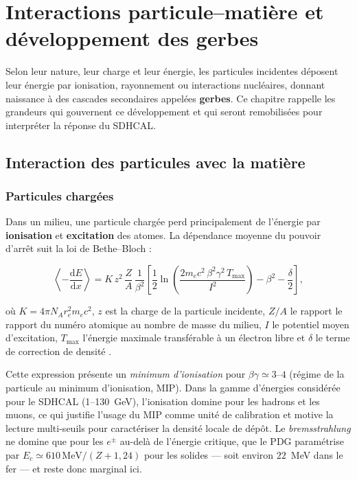 \chapter{Interactions particule--matière et développement des gerbes}
\label{sec:interactions}

Selon leur nature, leur charge et leur énergie, les particules incidentes déposent leur énergie par
ionisation, rayonnement ou interactions nucléaires, donnant naissance à des cascades secondaires
appelées \textbf{gerbes}. Ce chapitre rappelle les grandeurs qui gouvernent ce développement et qui
seront remobilisées pour interpréter la réponse du SDHCAL.

\section{Interaction des particules avec la matière}
\label{sec:interactions-matiere}

\subsection{Particules chargées}

Dans un milieu, une particule chargée perd principalement de l'énergie par \textbf{ionisation} et
\textbf{excitation} des atomes. La dépendance moyenne du pouvoir d'arrêt suit la loi de
Bethe--Bloch \cite{bichsel1988, pdg2024} :

\begin{equation}
\left\langle -\frac{\mathrm{d}E}{\mathrm{d}x} \right\rangle
= K\,z^{2}\,\frac{Z}{A}\,\frac{1}{\beta^{2}}
\left[
\frac{1}{2}\ln\!\left(
\frac{2 m_{e} c^{2}\,\beta^{2}\gamma^{2}\,T_{\max}}{I^{2}}
\right)
- \beta^{2} - \frac{\delta}{2}
\right],
\label{eq:bethe-bloch}
\end{equation}

où $K = 4\pi N_A r_e^2 m_e c^2$, $z$ est la charge de la particule incidente, $Z/A$ le rapport
le rapport du numéro atomique au nombre de masse du milieu, $I$ le potentiel moyen d'excitation, $T_{\max}$ l'énergie maximale
transférable à un électron libre et $\delta$ le terme de correction de densité \cite{pdg2024}.

Cette expression présente un \textit{minimum d'ionisation} pour $\beta\gamma \simeq 3$--$4$
(régime de la particule au minimum d'ionisation, MIP). Dans la gamme d'énergies considérée pour
le SDHCAL (1--130~GeV), l'ionisation domine pour les hadrons et les muons, ce qui justifie l'usage
du MIP comme unité de calibration et motive la lecture multi-seuils pour caractériser la densité
locale de dépôt. Le \textit{bremsstrahlung} ne domine que pour les $e^\pm$ au-delà de l'énergie
critique, que le PDG paramétrise par $E_c \simeq 610\,\mathrm{MeV}/(Z+1{,}24)$ pour les
solides \cite{pdg2024} — soit environ $22$~MeV dans le fer — et reste donc marginal ici.

